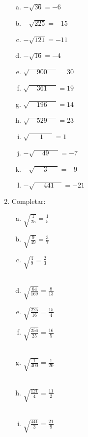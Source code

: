 \documentclass[a4paper,14pt]{article}
\begin{document}
\begin{multicols}{2}
\begin{enumerate}
\begin{enumerate}[a)]
        	\item $-\sqrt{36} = -6$
        	\item $-\sqrt{225} = -15$
        	\item $-\sqrt{121} = -11$
        	\item $-\sqrt{16} = -4$
        	\item $\sqrt{~~~~~900~~~~~~} = 30$
        	\item $\sqrt{~~~~~361~~~~~~} = 19$
        	\item $\sqrt{~~~~~196~~~~~~} = 14$
        	\item $\sqrt{~~~~~529~~~~~~} = 23$
        	\item $\sqrt{~~~~~~~1~~~~~~} = 1$
        	\item $-\sqrt{~~~~~49~~~~~~} = -7$
        	\item $-\sqrt{~~~~~~3~~~~~~~} = -9$
        	\item $-\sqrt{~~~~~~441~~~~~} = -21$
        \end{enumerate}
    	\item Completar:
    	\begin{enumerate}[a)]
    		\item $\sqrt{\frac{1}{25}} = \frac{1}{5}$
    		\item $\sqrt{\frac{9}{49}} = \frac{3}{7} $
    		\item $\sqrt{ \frac{4}{9}} = \frac{2}{3}$
    		\\\\
    		\item $\sqrt{\frac{64}{169}} =  \frac{8}{13}$
    		\item $\sqrt{\frac{225}{16}} =  \frac{15}{4}$
    		\item $\sqrt{ \frac{256}{25}} = \frac{16}{5}$
    		\\\\
    		\item $\sqrt{ \frac{1}{400}} = \frac{1}{20}$
    		\\\\
    		\item $\sqrt{ \frac{121}{4}} = \frac{11}{2}$
    		\\\\
    		\item $\sqrt{ \frac{441}{3}} = \frac{21}{9}$
    		\\\\
    		
    	\end{enumerate}
		
		
    \end{enumerate}        
    \end{multicols}    
\end{document}
